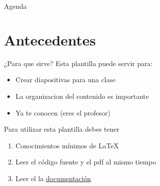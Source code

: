 \begin{frame}{}
    \maketitle
\end{frame}

\begin{frame}{Agenda}
    \begin{multicols}{2}
        \tableofcontents
    \end{multicols}
\end{frame}

\section{Antecedentes}
 \begin{frame}{¿Para que sirve?}
     Esta plantilla puede servir para:
     \begin{itemize}
         \item Crear diapositivas para una clase
         \item La organizacion del contenido es importante
         \item Ya te conocen (eres el profesor)
     \end{itemize}
% 
     \vspace{0.4cm} %
%     
     Para utilizar esta plantilla debes tener
     \begin{enumerate}
         \item Conocimientos mínimos de \LaTeX{}
         \item Leer el código fuente y el pdf al mismo tiempo
         \item Leer el la \href{https://github.com/nemediano/latexPlantillaUnam/blob/main/Notas/README.md}{documentación}
     \end{enumerate}
% 
     \vspace{0.2cm}

 \end{frame}

